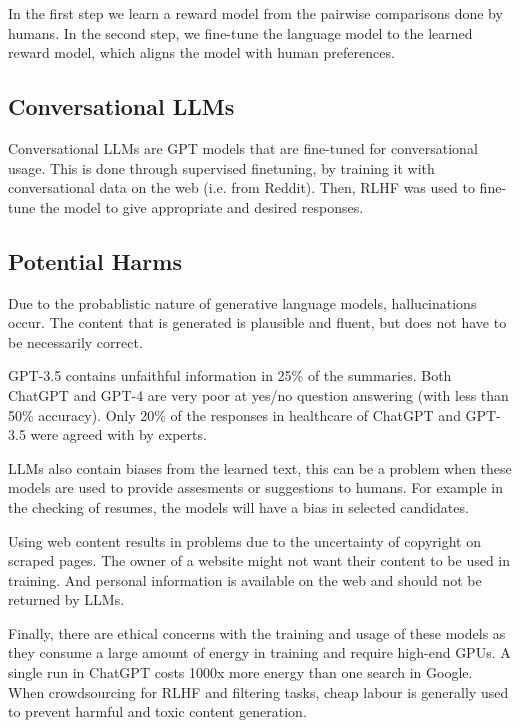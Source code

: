 In the first step we learn a reward model from the pairwise comparisons done
by humans. In the second step, we fine-tune the language model to the
learned reward
model, which aligns the model with human preferences.

\subsection{Conversational LLMs}

Conversational LLMs are GPT models that are fine-tuned for conversational
usage. This is done through supervised finetuning, by training it
with conversational
data on the web (i.e. from Reddit). Then, RLHF was used to fine-tune
the model to give
appropriate and desired responses.

\subsection{Potential Harms}

Due to the probablistic nature of generative language models, hallucinations
occur. The content that is generated is plausible and fluent, but does not have
to be necessarily correct.

GPT-3.5 contains unfaithful information in 25\% of the summaries. Both ChatGPT
and GPT-4 are very poor at yes/no question answering (with less than
50\% accuracy).
Only 20\% of the responses in healthcare of ChatGPT and GPT-3.5 were agreed with
by experts.

LLMs also contain biases from the learned text, this can be a problem
when these models are used to provide assesments or suggestions to humans. For
example in the checking of resumes, the models will have a bias in selected candidates.

Using web content results in problems due to the uncertainty of copyright
on scraped pages. The owner of a website might not want their content to be used in
training. And personal information is available on the web and should not be returned
by LLMs.

Finally, there are ethical concerns with the training and usage of these models as
they consume a large amount of energy in training and require high-end GPUs. A single
run in ChatGPT costs 1000x more energy than one search in Google. When crowdsourcing
for RLHF and filtering tasks, cheap labour is generally used to prevent harmful and
toxic content generation.

